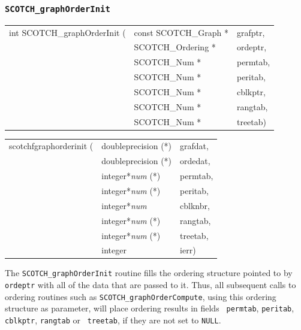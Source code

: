\subsubsection{{\tt SCOTCH\_graphOrderInit}}
\label{sec-lib-graph-order-init}

\begin{itemize}
\progsyn

{\tt\begin{tabular}{l@{}ll}
int SCOTCH\_graphOrderInit ( & const SCOTCH\_Graph * & grafptr, \\
                             & SCOTCH\_Ordering *    & ordeptr, \\
                             & SCOTCH\_Num *         & permtab, \\
                             & SCOTCH\_Num *         & peritab, \\
                             & SCOTCH\_Num *         & cblkptr, \\
                             & SCOTCH\_Num *         & rangtab, \\
                             & SCOTCH\_Num *         & treetab)
\end{tabular}}

{\tt\begin{tabular}{l@{}ll}
scotchfgraphorderinit ( & doubleprecision (*)   & grafdat, \\
                        & doubleprecision (*)   & ordedat, \\
                        & integer*{\it num} (*) & permtab, \\
                        & integer*{\it num} (*) & peritab, \\
                        & integer*{\it num}     & cblknbr, \\
                        & integer*{\it num} (*) & rangtab, \\
                        & integer*{\it num} (*) & treetab, \\
                        & integer               & ierr)
\end{tabular}}

\progdes

The {\tt SCOTCH\_graph\lbt Order\lbt Init} routine fills the ordering
structure pointed to by {\tt ordeptr} with all of the data that are
passed to it. Thus, all subsequent calls to ordering routines such as
{\tt SCOTCH\_\lbt graph\lbt Order\lbt Compute}, using this ordering
structure as parameter, will place ordering results in fields {\tt
permtab}, {\tt peritab}, {\tt *cblkptr}, {\tt rangtab} or {\tt
treetab}, if they are not set to {\tt NULL}.


\end{itemize}
